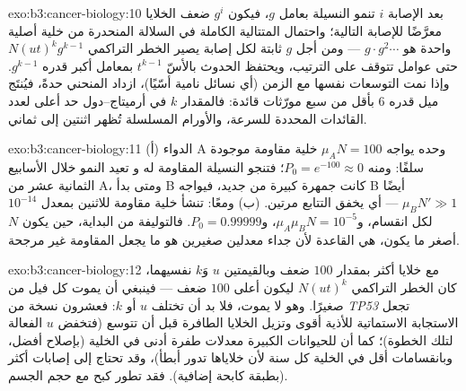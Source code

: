 \begin{solution}{exo:b3:cancer-biology:10}
بعد الإصابة $i$ تنمو النسيلة بعامل $g$، فيكون $g^{i}$ ضعف
الخلايا معرَّضًا للإصابة التالية؛ واحتمال المتتالية الكاملة
في السلالة المنحدرة من خلية أصلية واحدة هو $g\cdot g^{2}\cdots$
--- ومن أجل $g$ ثابتة لكل إصابة يصير الخطر التراكمي $N(ut)^{k}
g^{k-1}$ حتى عوامل تتوقف على الترتيب، ويحتفظ الحدوث
بالأسّ $t^{k-1}$ بمعامل أكبر قدره $g^{k-1}$. وإذا نمت التوسعات
نفسها مع الزمن (أي نسائل نامية أسّيًا)، ازداد المنحني حدةً،
فيُنتَج ميل قدره $6$ بأقل من سبع مورّثات
قائدة: فالمقدار $k$ في أرميتاج--دول حد أعلى لعدد
القائدات المحددة للسرعة، والأورام المسلسلة تُظهر اثنتين إلى ثماني.
\end{solution}

\begin{solution}{exo:b3:cancer-biology:11}
(أ) الدواء A وحده يواجه $\mu_{A}N = 100$ خلية مقاومة موجودة سلفًا:
ومنه $P_{0} = e^{-100} \approx 0$؛ فتنجو النسيلة المقاومة له و
تعيد النمو خلال الأسابيع الثمانية عشر من A، ومتى بدأ B كانت
جمهرة كبيرة من جديد، فيواجه B أيضًا $\mu_{B}N' \gg 1$ --- أي يخفق
التتابع مرتين. (ب) ومعًا: تنشأ خلية مقاومة للاثنين بمعدل
$10^{-14}$ لكل انقسام، و$\mu_{A}\mu_{B}N = 10^{-5}$، و$P_{0} =
0.99999$. فالتوليفة من البداية، حين يكون $N$ أصغر ما يكون، هي
القاعدة لأن جداء معدلين صغيرين هو ما يجعل المقاومة
غير مرجحة.
\end{solution}

\begin{solution}{exo:b3:cancer-biology:12}
مع خلايا أكثر بمقدار $100$ ضعف وبالقيمتين $u$ وَ$k$ نفسيهما، كان الخطر التراكمي
$N(ut)^{k}$ ليكون أعلى $100$ ضعف --- فينبغي أن يموت كل فيل من
 صغيرًا. وهو لا يموت، فلا بد أن تختلف $u$ أو $k$: فعشرون نسخة من
\emph{TP53} تجعل الاستجابة الاستماتية للأذية أقوى وتزيل
الخلايا الطافرة قبل أن تتوسع (فتخفض $u$ الفعالة لتلك
الخطوة)؛ كما أن للحيوانات الكبيرة معدلات طفرة أدنى في الخلية (بإصلاح
أفضل، وبانقسامات أقل في الخلية كل سنة لأن خلاياها تدور
أبطأ)، وقد تحتاج إلى إصابات أكثر (بطبقة كابحة إضافية).
فقد تطور كبح  مع حجم الجسم.
\end{solution}

